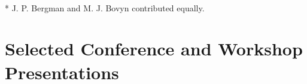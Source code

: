 \documentclass[letterpaper,10pt]{article} %
\begin{document}
\begin{description}[itemsep=-1ex]
\item {}

\item {} \\ \** J. P. Bergman and M. J. Bovyn contributed equally.

\item {}

\item {}

%
%
%
%
%

\end{description}


\section*{Selected Conference and Workshop Presentations}
\bigskip
\end{document}
